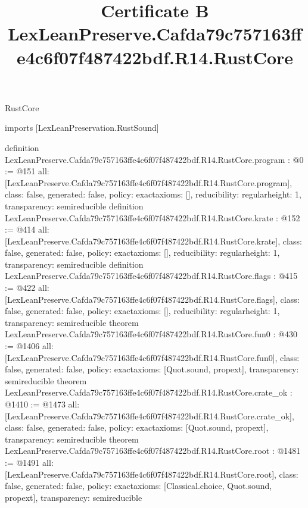 \begin{lexlean}{RustCore}
\title{Certificate B LexLeanPreserve.Cafda79c757163ffe4c6f07f487422bdf.R14.RustCore}
\begin{coremodule}
imports [LexLeanPreservation.RustSound]

definition LexLeanPreserve.Cafda79c757163ffe4c6f07f487422bdf.R14.RustCore.program : @0 := @151 {
  all: [LexLeanPreserve.Cafda79c757163ffe4c6f07f487422bdf.R14.RustCore.program],
  class: false,
  generated: false,
  policy: exact{axioms: []},
  reducibility: regular{height: 1},
  transparency: semireducible
}
definition LexLeanPreserve.Cafda79c757163ffe4c6f07f487422bdf.R14.RustCore.krate : @152 := @414 {
  all: [LexLeanPreserve.Cafda79c757163ffe4c6f07f487422bdf.R14.RustCore.krate],
  class: false,
  generated: false,
  policy: exact{axioms: []},
  reducibility: regular{height: 1},
  transparency: semireducible
}
definition LexLeanPreserve.Cafda79c757163ffe4c6f07f487422bdf.R14.RustCore.flags : @415 := @422 {
  all: [LexLeanPreserve.Cafda79c757163ffe4c6f07f487422bdf.R14.RustCore.flags],
  class: false,
  generated: false,
  policy: exact{axioms: []},
  reducibility: regular{height: 1},
  transparency: semireducible
}
theorem LexLeanPreserve.Cafda79c757163ffe4c6f07f487422bdf.R14.RustCore.fun0 : @430 := @1406 {
  all: [LexLeanPreserve.Cafda79c757163ffe4c6f07f487422bdf.R14.RustCore.fun0],
  class: false,
  generated: false,
  policy: exact{axioms: [Quot.sound, propext]},
  transparency: semireducible
}
theorem LexLeanPreserve.Cafda79c757163ffe4c6f07f487422bdf.R14.RustCore.crate_ok : @1410 := @1473 {
  all: [LexLeanPreserve.Cafda79c757163ffe4c6f07f487422bdf.R14.RustCore.crate_ok],
  class: false,
  generated: false,
  policy: exact{axioms: [Quot.sound, propext]},
  transparency: semireducible
}
theorem LexLeanPreserve.Cafda79c757163ffe4c6f07f487422bdf.R14.RustCore.root : @1481 := @1491 {
  all: [LexLeanPreserve.Cafda79c757163ffe4c6f07f487422bdf.R14.RustCore.root],
  class: false,
  generated: false,
  policy: exact{axioms: [Classical.choice, Quot.sound, propext]},
  transparency: semireducible
}


\end{coremodule}
\end{lexlean}
